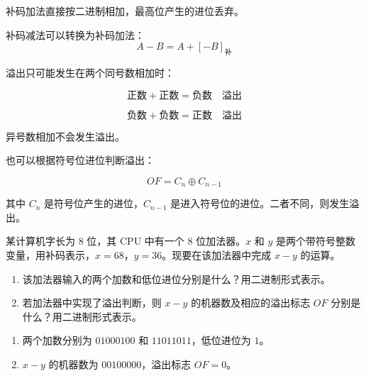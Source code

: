 \begin{knowledge}
补码加法直接按二进制相加，最高位产生的进位丢弃。

补码减法可以转换为补码加法：
\[
A - B = A + [-B]_{\text{补}}
\]

溢出只可能发生在两个同号数相加时：

\[
\text{正数} + \text{正数} = \text{负数} \quad \text{溢出}
\]

\[
\text{负数} + \text{负数} = \text{正数} \quad \text{溢出}
\]

异号数相加不会发生溢出。

也可以根据符号位进位判断溢出：

\[
OF = C_n \oplus C_{n-1}
\]

其中 $C_n$ 是符号位产生的进位，$C_{n-1}$ 是进入符号位的进位。二者不同，则发生溢出。
\end{knowledge}


\begin{question}
某计算机字长为 $8$ 位，其 CPU 中有一个 $8$ 位加法器。$x$ 和 $y$ 是两个带符号整数变量，用补码表示，$x=68$，$y=36$。现要在该加法器中完成 $x-y$ 的运算。

\begin{enumerate}
    \item 该加法器输入的两个加数和低位进位分别是什么？用二进制形式表示。
    \item 若加法器中实现了溢出判断，则 $x-y$ 的机器数及相应的溢出标志 $OF$ 分别是什么？用二进制形式表示。
\end{enumerate}
\end{question}

\begin{answer}
\begin{enumerate}
    \item 两个加数分别为 $01000100$ 和 $11011011$，低位进位为 $1$。
    \item $x-y$ 的机器数为 $00100000$，溢出标志 $OF=0$。
\end{enumerate}
\end{answer}


